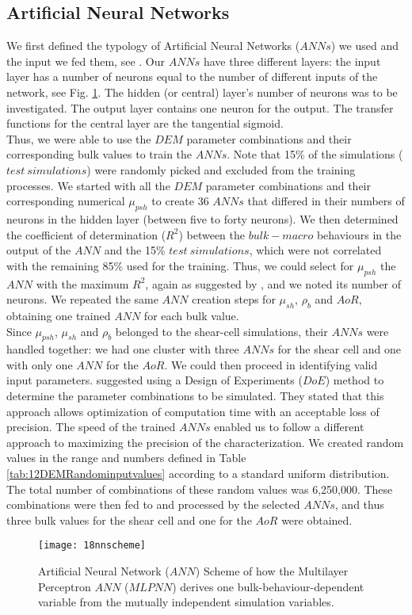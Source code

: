 \documentclass{CFD2015}
\begin{document}
\subsection{Artificial Neural Networks}
\label{subsec:ann}
We first defined the typology of Artificial Neural Networks ($ANNs$) we used and
the input we fed them, see \citet{RefWorks:180}.
Our $ANNs$ have three different layers: the input layer has a number of neurons
equal to the number of different inputs of the network, see Fig. \ref{fig:18nnscheme}.
The hidden (or central) layer's number of neurons was to be investigated. 
The output layer contains one neuron for the output.
The transfer functions for the central layer are the tangential sigmoid.\\
Thus, we were able to use the $DEM$ parameter combinations and their
corresponding bulk values to train the $ANNs$.
Note that 15\% of the simulations ($test ~ simulations$) were
randomly picked and excluded from the training processes.
We started with all the $DEM$ parameter combinations and their corresponding
numerical $\mu_{psh}$ to create 36 $ANNs$ that differed in their numbers of
neurons in the hidden layer (between five to forty neurons).
We then determined the coefficient of determination ($R^2$) between the
$bulk-macro$ behaviours in the output of the $ANN$ and the 15\% $test ~ simulations$, 
which were not correlated with the remaining 85\% used for the training. 
Thus, we could select for $\mu_{psh}$ the $ANN$ with the maximum $R^2$, 
again as suggested by \citet{RefWorks:150}, and we noted its number
of neurons.
We repeated the same $ANN$ creation steps for $\mu_{sh}$, $\rho_b$
and $AoR$, obtaining one trained $ANN$ for each bulk value. \\
Since $\mu_{psh}$, $\mu_{sh}$ and $\rho_b$ belonged to the shear-cell
simulations, their $ANNs$ were handled together: we had one cluster with three 
$ANNs$ for the shear cell and one with only one $ANN$ for the $AoR$.
We could then proceed in identifying valid input parameters.
\citet{RefWorks:160} suggested using a Design of Experiments
($DoE$) method to determine the parameter combinations to be simulated.
They stated that this approach allows optimization of computation time
with an acceptable loss of precision.
The speed of the trained $ANNs$ enabled us to follow a different approach to
maximizing the precision of the characterization.
We created random values
in the range and numbers defined in Table \ref{tab:12DEMRandominputvalues}
according to a standard uniform distribution.
The total number of combinations of these random values was 6,250,000.
These combinations were then fed to and processed by the selected
$ANNs$, and thus three bulk values for the shear
cell and one for the $AoR$ were obtained.
\begin{figure}%
\centering 
\texttt{[image: 18nnscheme]} 
\caption[ANN Scheme]{Artificial Neural Network ($ANN$) Scheme
of how the Multilayer Perceptron $ANN$ ($MLPNN$) derives one
bulk-behaviour-dependent variable from the mutually independent simulation variables.}
\label{fig:18nnscheme} 
\end{figure}
\end{document}
